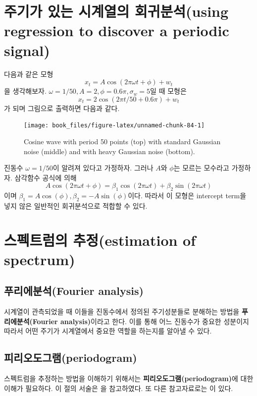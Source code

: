 \documentclass[b5paper,]{scrbook}
\theoremstyle{plain}
\theoremstyle{definition}
\numberwithin{equation}{section}
\begin{document}
\section{주기가 있는 시계열의 회귀분석(using regression to discover a
periodic
signal)}\label{---using-regression-to-discover-a-periodic-signal}

다음과 같은 모형 \[x_{t}=A\cos (2\pi\omega t + \phi) + w_{t}\] 을
생각해보자. \(\omega=1/50, A=2,\phi=0.6\pi, \sigma_{w}=5\)일 때 모형은
\[x_{t}=2\cos (2\pi t /50 + 0.6 \pi) + w_{t}\] 가 되며 그림으로 출력하면
다음과 같다.

\begin{figure}

{\centering \texttt{[image: book\_files/figure-latex/unnamed-chunk-84-1]} 

}

\caption{Cosine wave with period 50 points (top) with standard Gaussian noise (middle) and with heavy Gaussian noise (bottom).}\label{fig:unnamed-chunk-84}
\end{figure}

진동수 \(\omega=1/50\)이 알려져 있다고 가정하자. 그러나 \(A\)와
\(\phi\)는 모르는 모수라고 가정하자. 삼각함수 공식에 의해
\[A\cos (2\pi \omega t + \phi)=\beta_{1}\cos (2\pi \omega t) + \beta_{2}\sin (2\pi\omega t)\]
이며 \(\beta_{1}=A\cos(\phi), \beta_{2}=-A\sin(\phi)\)이다. 따라서 이
모형은 intercept term을 넣지 않은 일반적인 회귀분석으로 적합할 수 있다.

\section{스펙트럼의 추정(estimation of
spectrum)}\label{-estimation-of-spectrum}

\subsection{푸리에분석(Fourier analysis)}\label{fourier-analysis}

시계열이 관측되었을 때 이들을 진동수에서 정의된 주기성분들로 분해하는
방법을 \textbf{푸리에분석(Fourier analysis)}이라고 한다. 이를 통해 어느
진동수가 중요한 성분이지 따라서 어떤 주기가 시계열에서 중요한 역할을
하는지를 알아낼 수 있다.

\subsection{피리오도그램(periodogram)}\label{periodogram}

스펙트럼을 추정하는 방법을 이해하기 위해서는
\textbf{피리오도그램(periodogram)}에 대한 이해가 필요하다. 이 절의
서술은 \citep{Lim2013}을 참고하였다. 또 다른 참고자료로는
\citep{Shumway2010}이 있다.
\end{document}

